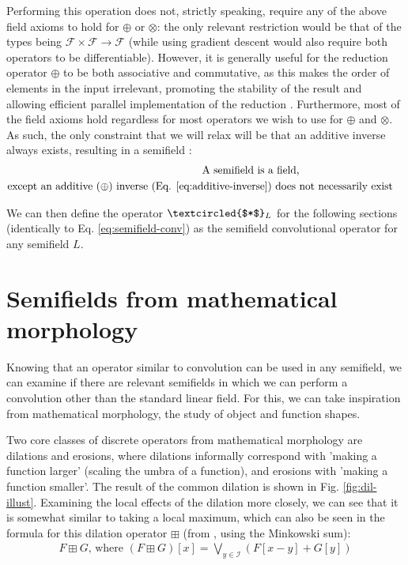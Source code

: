 \documentclass[a4paper, 12pt]{report}
\begin{document}
Performing this operation does not, strictly speaking, require any of the above field axioms to hold for $\oplus$ or $\otimes$: the only relevant restriction would be that of the types being $\mathcal{F}\times\mathcal{F}\rightarrow\mathcal{F}$ (while using gradient descent would also require both operators to be differentiable). However, it is generally useful for the reduction operator $\oplus$ to be both associative and commutative, as this makes the order of elements in the input irrelevant, promoting the stability of the result and allowing efficient parallel implementation of the reduction \cite{ppad}. Furthermore, most of the field axioms hold regardless for most operators we wish to use for $\oplus$ and $\otimes$. As such, the only constraint that we will relax will be that an additive inverse always exists, resulting in a semifield \cite{bellaardaxiomatic}:
\begin{align}
	\textrm{A semifield is a field,}\nonumber \\ \textrm{except an additive ($\oplus$) inverse (Eq. \ref{eq:additive-inverse}) does }& \textrm{not necessarily exist}
\end{align}

We can then define the operator $\textcircled{$*$}_L$ for the following sections (identically to Eq. \ref{eq:semifield-conv}) as the semifield convolutional operator for any semifield $L$.

\section{Semifields from mathematical morphology}
Knowing that an operator similar to convolution can be used in any semifield, we can examine if there are relevant semifields in which we can perform a convolution other than the standard linear field. For this, we can take inspiration from mathematical morphology, the study of object and function shapes.

Two core classes of discrete operators from mathematical morphology are dilations and erosions, where dilations informally correspond with 'making a function larger' (scaling the umbra of a function), and erosions with 'making a function smaller'. The result of the common dilation is shown in Fig. \ref{fig:dil-illust}. Examining the local effects of the dilation more closely, we can see that it is somewhat similar to taking a local maximum, which can also be seen in the formula for this dilation operator $\boxplus$  (from \cite{heijmans1996morphological}, using the Minkowski sum): 
\begin{align}
F \boxplus G \textrm{, where }(F \boxplus G)[x] = \bigvee_ {y\in\mathcal{I}} \left(F[x-y] + G[y]\right)	
\end{align}
\end{document}
